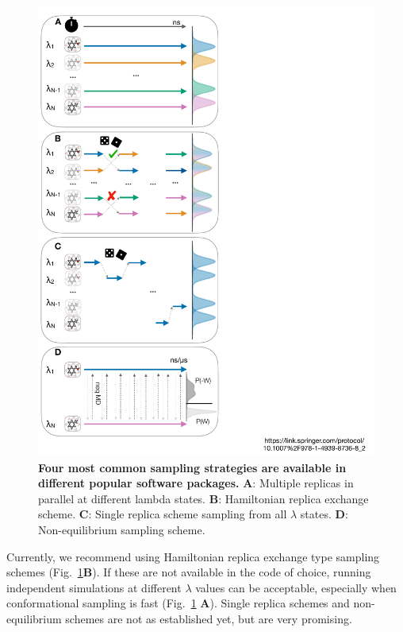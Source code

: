 \documentclass[9pt,bestpractices]{livecoms}
\begin{document}
%
\begin{figure}
    \includegraphics[width=0.95\columnwidth]{figures/fig8_sampl_scheme/Figure.pdf}
    \caption{\textbf{Four most common sampling strategies are available in different popular software packages.} \textbf{A}: Multiple replicas in parallel at different lambda states. \textbf{B}: Hamiltonian replica exchange scheme. \textbf{C}: Single replica scheme sampling from all $\lambda$ states. \textbf{D}: Non-equilibrium sampling scheme.}
    \label{fig:fig_sampling_scheme}
\end{figure} 

Currently, we recommend using Hamiltonian replica exchange type sampling schemes (Fig.~\ref{fig:fig_sampling_scheme}\textbf{B}). If these are not available in the code of choice, running independent simulations at different $\lambda$ values can be acceptable, especially when conformational sampling is fast (Fig.~\ref{fig:fig_sampling_scheme} \textbf{A}). Single replica schemes and non-equilibrium schemes are not as established yet, but are very promising.
\end{document}
